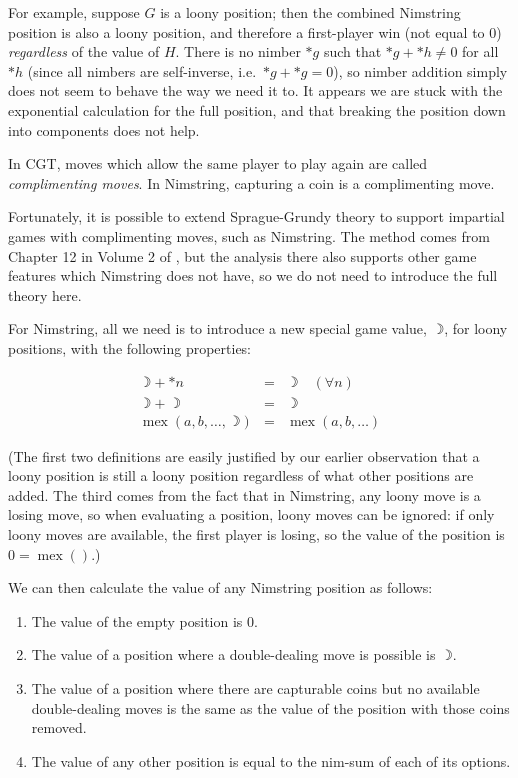 \documentclass[a4paper,twocolumn]{article}
\DeclareMathOperator{\mex}{mex}
\newcommand{\loony}{\rightmoon}
\begin{document}
For example, suppose $G$ is a loony position; then the combined
Nimstring position is also a loony position, and therefore a
first-player win (not equal to $0$) \emph{regardless} of the value of
$H$. There is no nimber $*g$ such that $*g + *h \neq 0$ for all $*h$
(since all nimbers are self-inverse, i.e.\ $*g + *g = 0$), so nimber
addition simply does not seem to behave the way we need it to. It
appears we are stuck with the exponential calculation for the full
position, and that breaking the position down into components does not
help.

In CGT, moves which allow the same player to play again are called
\emph{complimenting moves}. In Nimstring, capturing a coin is a
complimenting move.

Fortunately, it is possible to extend Sprague-Grundy theory to support
impartial games with complimenting moves, such as Nimstring. The
method comes from Chapter 12 in Volume 2 of \cite{wways}, but the
analysis there also supports other game features which Nimstring does
not have, so we do not need to introduce the full theory here.

For Nimstring, all we need is to introduce a new special game value,
$\loony$, for loony positions, with the following properties:

\begin{eqnarray*}
  \loony + *n & = & \loony \quad (\forall n)\\
  \loony + \loony & = & \loony \\
  \mex(a, b, \ldots, \loony) & = & \mex(a, b, \ldots)
\end{eqnarray*}

(The first two definitions are easily justified by our earlier
observation that a loony position is still a loony position regardless
of what other positions are added. The third comes from the fact that
in Nimstring, any loony move is a losing move, so when evaluating a
position, loony moves can be ignored: if only loony moves are
available, the first player is losing, so the value of the position is
$0 = \mex()$.)

We can then calculate the value of any Nimstring position as follows:

\begin{enumerate}
  \item The value of the empty position is $0$.
  \item The value of a position where a double-dealing move is
    possible is $\loony$.
  \item The value of a position where there are capturable coins but
    no available double-dealing moves is the same as the value of the
    position with those coins removed.
  \item The value of any other position is equal to the nim-sum of
    each of its options.
\end{enumerate}
\end{document}
